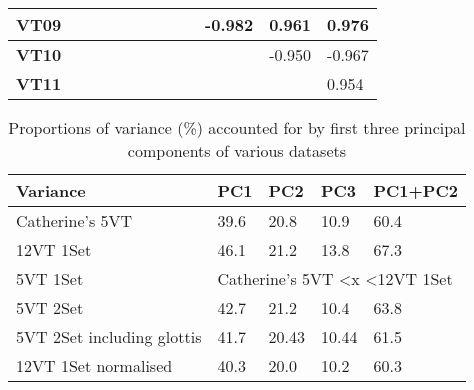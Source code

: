 \documentclass{article}
\begin{document}
\begin{table}[]
\begin{tabular}{|c|l|l|l|l|l|l|l|l|l|l|l|}
\textbf{VT09}         & \cellcolor[HTML]{C0C0C0}           & \cellcolor[HTML]{C0C0C0}           & \cellcolor[HTML]{C0C0C0}{\color[HTML]{C0C0C0} } & \cellcolor[HTML]{C0C0C0}{\color[HTML]{C0C0C0} } & \cellcolor[HTML]{C0C0C0}{\color[HTML]{C0C0C0} } & \cellcolor[HTML]{C0C0C0}{\color[HTML]{C0C0C0} } & \cellcolor[HTML]{C0C0C0}           & \cellcolor[HTML]{C0C0C0}           & -0.982                             & 0.961                              & 0.976                              \\ \hline
\textbf{VT10}         & \cellcolor[HTML]{C0C0C0}           & \cellcolor[HTML]{C0C0C0}           & \cellcolor[HTML]{C0C0C0}{\color[HTML]{C0C0C0} } & \cellcolor[HTML]{C0C0C0}{\color[HTML]{C0C0C0} } & \cellcolor[HTML]{C0C0C0}{\color[HTML]{C0C0C0} } & \cellcolor[HTML]{C0C0C0}{\color[HTML]{C0C0C0} } & \cellcolor[HTML]{C0C0C0}           & \cellcolor[HTML]{C0C0C0}           & \cellcolor[HTML]{C0C0C0}           & -0.950                             & -0.967                             \\ \hline
\textbf{VT11}         & \cellcolor[HTML]{C0C0C0}           & \cellcolor[HTML]{C0C0C0}           & \cellcolor[HTML]{C0C0C0}{\color[HTML]{C0C0C0} } & \cellcolor[HTML]{C0C0C0}{\color[HTML]{C0C0C0} } & \cellcolor[HTML]{C0C0C0}{\color[HTML]{C0C0C0} } & \cellcolor[HTML]{C0C0C0}{\color[HTML]{C0C0C0} } & \cellcolor[HTML]{C0C0C0}           & \cellcolor[HTML]{C0C0C0}           & \cellcolor[HTML]{C0C0C0}           & \cellcolor[HTML]{C0C0C0}           & 0.954                              \\ \hline
\end{tabular}
\end{table}

\begin{table}[]
\centering
\caption{Proportions of variance (\%) accounted for by first three principal components of various datasets}
\label{variance}
\begin{tabular}{|l|l|l|l|l|}
\hline
\textbf{Variance} & \textbf{PC1}   & \textbf{PC2}   & \textbf{PC3}   & \textbf{PC1+PC2}  \\ \hline
Catherine's 5VT   & 39.6           & 20.8           & 10.9           & 60.4              \\ \hline
12VT 1Set         & 46.1           & 21.2           & 13.8           & 67.3              \\ \hline
5VT 1Set          & \multicolumn{4}{l|}{Catherine's 5VT \textless x \textless 12VT 1Set} \\ \hline
5VT 2Set          & 42.7           & 21.2           & 10.4           & 63.8              \\ \hline
5VT 2Set including glottis      & 41.7           & 20.43           & 10.44           & 61.5              \\ \hline
12VT 1Set normalised         & 40.3           & 20.0           & 10.2           & 60.3              \\ \hline
\end{tabular}
\end{table}
\end{document}

